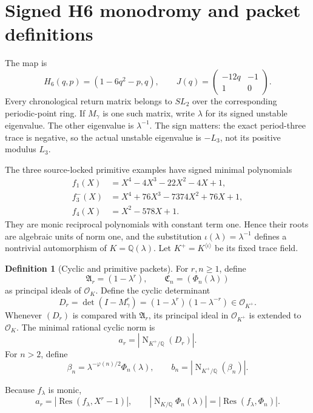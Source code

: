 \documentclass[11pt]{article}
\theoremstyle{definition}\newtheorem{definition}[theorem]{Definition}
\theoremstyle{remark}\newtheorem{remark}[theorem]{Remark}
\DeclareMathOperator{\Resultant}{Res}
\DeclareMathOperator{\FieldNorm}{N}
\begin{document}
\section{Signed H6 monodromy and packet definitions}

The map is
\[
H_6(q,p)=(1-6q^2-p,q),
\qquad
J(q)=\begin{pmatrix}-12q&-1\\1&0\end{pmatrix}.
\]
Every chronological return matrix belongs to $SL_2$ over the corresponding
periodic-point ring.  If $M_\gamma$ is one such matrix, write $\lambda$ for
its signed unstable eigenvalue.  The other eigenvalue is $\lambda^{-1}$.
The sign matters: the exact period-three trace is negative, so the actual
unstable eigenvalue is $-L_3$, not its positive modulus $L_3$.

The three source-locked primitive examples have signed minimal polynomials
\begin{align}
f_1(X)&=X^4-4X^3-22X^2-4X+1,\label{eq:f1}\\
f_3^-(X)&=X^4+76X^3-7374X^2+76X+1,\label{eq:f3}\\
f_4(X)&=X^2-578X+1.\label{eq:f4}
\end{align}
They are monic reciprocal polynomials with constant term one.  Hence their
roots are algebraic units of norm one, and the substitution
$\iota(\lambda)=\lambda^{-1}$ defines a nontrivial automorphism of
$K=\mathbb Q(\lambda)$.  Let $K^+=K^{\langle\iota\rangle}$ be its fixed
trace field.

\begin{definition}[Cyclic and primitive packets]
For $r,n\ge1$, define
\[
\mathfrak A_r=(1-\lambda^r),
\qquad
\mathfrak C_n=(\Phi_n(\lambda))
\]
as principal ideals of $\mathcal O_K$.  Define the cyclic determinant
\[
D_r=\det(I-M_\gamma^r)
=(1-\lambda^r)(1-\lambda^{-r})\in\mathcal O_{K^+}.
\]
Whenever $(D_r)$ is compared with $\mathfrak A_r$, its principal ideal in
$\mathcal O_{K^+}$ is extended to $\mathcal O_K$.
The minimal rational cyclic norm is
\[
a_r=\left|\FieldNorm_{K^+/\mathbb Q}(D_r)\right|.
\]
For $n>2$, define
\[
\beta_n=\lambda^{-\varphi(n)/2}\Phi_n(\lambda),
\qquad
b_n=\left|\FieldNorm_{K^+/\mathbb Q}(\beta_n)\right|.
\]
\end{definition}

Because $f_\lambda$ is monic,
\begin{equation}\label{eq:resultants}
a_r=\left|\Resultant(f_\lambda,X^r-1)\right|,
\qquad
\left|\FieldNorm_{K/\mathbb Q}\Phi_n(\lambda)\right|
=\left|\Resultant(f_\lambda,\Phi_n)\right|.
\end{equation}
\end{document}
